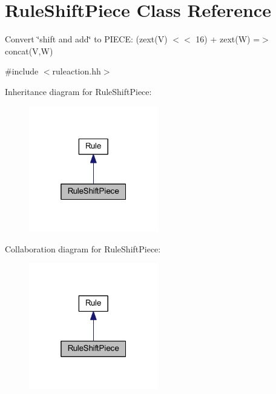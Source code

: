 \hypertarget{class_rule_shift_piece}{}\section{Rule\+Shift\+Piece Class Reference}
\label{class_rule_shift_piece}


Convert \char`\"{}shift and add\char`\"{} to P\+I\+E\+CE\+: (zext(\+V) $<$$<$ 16) + zext(\+W) =$>$ concat(\+V,\+W)  




{\ttfamily \#include $<$ruleaction.\+hh$>$}



Inheritance diagram for Rule\+Shift\+Piece\+:
\nopagebreak
\begin{figure}[H]
\begin{center}
\leavevmode
\includegraphics[width=160pt]{class_rule_shift_piece__inherit__graph}
\end{center}
\end{figure}


Collaboration diagram for Rule\+Shift\+Piece\+:
\nopagebreak
\begin{figure}[H]
\begin{center}
\leavevmode
\includegraphics[width=160pt]{class_rule_shift_piece__coll__graph}
\end{center}
\end{figure}
